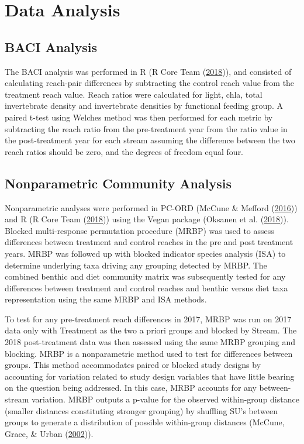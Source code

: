\documentclass[double,12pt]{beavtex}
\begin{document}
  \section*{Data Analysis}\label{data-analysis}
  
  \subsection*{BACI Analysis}\label{baci-analysis}
  
  The BACI analysis was performed in R (R Core Team
  (\protect\hyperlink{ref-R-base}{2018})), and consisted of calculating
  reach-pair differences by subtracting the control reach value from the
  treatment reach value. Reach ratios were calculated for light, chla,
  total invertebrate density and invertebrate densities by functional
  feeding group. A paired t-test using Welches method was then performed
  for each metric by subtracting the reach ratio from the pre-treatment
  year from the ratio value in the post-treatment year for each stream
  assuming the difference between the two reach ratios should be zero, and
  the degrees of freedom equal four.
  
  \subsection*{Nonparametric Community
  Analysis}\label{nonparametric-community-analysis}
  
  Nonparametric analyses were performed in PC-ORD (McCune \& Mefford
  (\protect\hyperlink{ref-PC-ORD}{2016})) and R (R Core Team
  (\protect\hyperlink{ref-R-base}{2018})) using the Vegan package (Oksanen
  et al. (\protect\hyperlink{ref-vegan}{2018})). Blocked multi-response
  permutation procedure (MRBP) was used to assess differences between
  treatment and control reaches in the pre and post treatment years. MRBP
  was followed up with blocked indicator species analysis (ISA) to
  determine underlying taxa driving any grouping detected by MRBP. The
  combined benthic and diet community matrix was subsequently tested for
  any differences between treatment and control reaches and benthic versus
  diet taxa representation using the same MRBP and ISA methods.
  
  To test for any pre-treatment reach differences in 2017, MRBP was run on
  2017 data only with Treatment as the two a priori groups and blocked by
  Stream. The 2018 post-treatment data was then assessed using the same
  MRBP grouping and blocking. MRBP is a nonparametric method used to test
  for differences between groups. This method accommodates paired or
  blocked study designs by accounting for variation related to study
  design variables that have little bearing on the question being
  addressed. In this case, MRBP accounts for any between-stream variation.
  MRBP outputs a p-value for the observed within-group distance (smaller
  distances constituting stronger grouping) by shuffling SU's between
  groups to generate a distribution of possible within-group distances
  (McCune, Grace, \& Urban (\protect\hyperlink{ref-McCune2002}{2002})).
  
\end{document}
